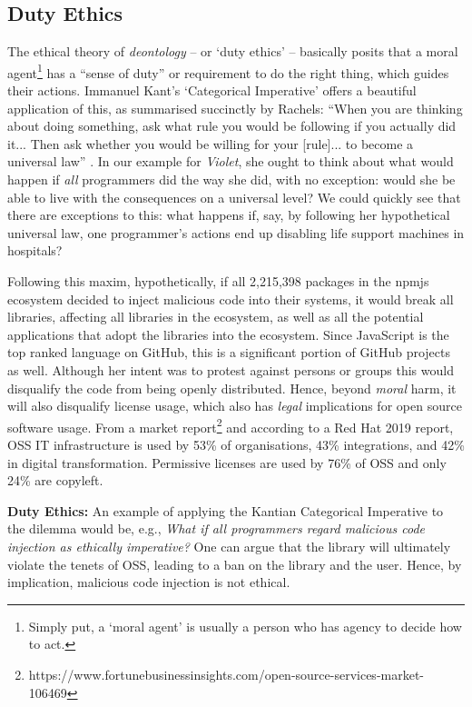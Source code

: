\documentclass[journal,twocolumn]{IEEEtran}
\begin{document}
\subsection{Duty Ethics}
The ethical theory of \textit{deontology} -- or `duty ethics' -- basically posits that a moral agent\footnote{Simply put, a `moral agent' is usually a person who has agency to decide how to act.} has a ``sense of duty'' or requirement to do the right thing, which guides their actions. Immanuel Kant's `Categorical Imperative' offers a beautiful application of this, as summarised succinctly by Rachels: ``When you are thinking about doing something, ask what rule you would be following if you actually did it... Then ask whether you would be willing for your [rule]... to become a universal law'' \cite{Rachels2015}. In our example for \textit{Violet}, she ought to think about what would happen if \textit{all} programmers did the way she did, with no exception: would she be able to live with the consequences on a universal level? We could quickly see that there are exceptions to this: what happens if, say, by following her hypothetical universal law, one programmer's actions end up disabling life support machines in hospitals?

Following this maxim, %
hypothetically, if all 2,215,398 packages in the npmjs ecosystem decided to inject malicious code into their systems, it would break all libraries, affecting all libraries in the ecosystem, as well as all the potential applications that adopt the libraries into the ecosystem. 
Since JavaScript is the top ranked language on GitHub, this is a significant portion of GitHub projects as well.
Although her intent was to protest against persons or groups this would disqualify the code from being openly distributed.
Hence, beyond \textit{moral} harm, it will also disqualify license usage, which also has \textit{legal} implications for open source software usage.
From a market report\footnote{https://www.fortunebusinessinsights.com/open-source-services-market-106469} and according to a Red Hat 2019 report, OSS IT infrastructure is used by 53\% of organisations, 43\% integrations, and 42\% in digital transformation. 
Permissive licenses are used by 76\% of OSS and only 24\% are copyleft. 
\begin{tcolorbox}
\textbf{Duty Ethics:} An example of applying the Kantian Categorical Imperative to the dilemma would be, e.g., \textit{What if all programmers regard malicious code injection as ethically imperative?} One can argue that the library will ultimately violate the tenets of OSS, leading to a ban on the library and the user. Hence, by implication, malicious code injection is not ethical.
\end{tcolorbox}
\end{document}
